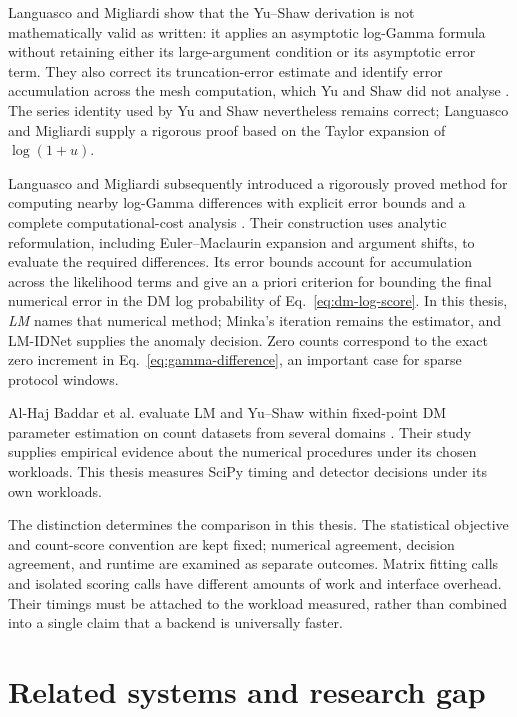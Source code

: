 Languasco and Migliardi show that the Yu--Shaw derivation is not
mathematically valid as written: it applies an asymptotic log-Gamma formula
without retaining either its large-argument condition or its asymptotic
error term. They also correct its truncation-error estimate and identify
error accumulation across the mesh computation, which Yu and Shaw did not
analyse \cite[Introduction, p.~1997; Sec.~4]{languasco2023}. The series
identity used by Yu and Shaw nevertheless remains correct; Languasco and
Migliardi supply a rigorous proof based on the Taylor expansion of
$\log(1+u)$.

Languasco and Migliardi subsequently introduced a rigorously proved method
for computing nearby log-Gamma differences with explicit error bounds and
a complete computational-cost analysis \cite{languasco2023}. Their
construction uses analytic reformulation, including Euler--Maclaurin
expansion and argument shifts, to evaluate the required differences. Its
error bounds account for accumulation across the likelihood terms and give
an a priori criterion for bounding the final numerical error in the DM log
probability of Eq.~\eqref{eq:dm-log-score}. In this thesis, \emph{LM} names
that numerical method; Minka's iteration remains the estimator, and
LM-IDNet supplies the anomaly decision.
Zero counts correspond to the exact zero increment in
Eq.~\eqref{eq:gamma-difference}, an important case for sparse protocol
windows.

Al-Haj Baddar et al. evaluate LM and Yu--Shaw within fixed-point DM
parameter estimation on count datasets from several domains
\cite{alhajbaddar2025analysis}. Their study supplies empirical evidence
about the numerical procedures under its chosen workloads. This thesis
measures SciPy timing and detector decisions under its own workloads.

The distinction determines the comparison in this thesis. The statistical
objective and count-score convention are kept fixed; numerical agreement,
decision agreement, and runtime are examined as separate outcomes. Matrix
fitting calls and isolated scoring calls have different amounts of work
and interface overhead. Their timings must be attached to the workload
measured, rather than combined into a single claim that a backend is
universally faster.

\section{Related systems and research gap}
\label{sec:background-related}

